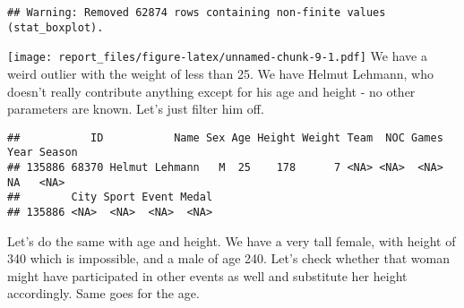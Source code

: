 \documentclass[
]{article}
\newenvironment{Shaded}{\begin{snugshade}}{\end{snugshade}}
\newcommand{\DecValTok}[1]{\textcolor[rgb]{0.00,0.00,0.81}{#1}}
\newcommand{\FunctionTok}[1]{\textcolor[rgb]{0.00,0.00,0.00}{#1}}
\newcommand{\NormalTok}[1]{#1}
\newcommand{\OtherTok}[1]{\textcolor[rgb]{0.56,0.35,0.01}{#1}}
\newcommand{\SpecialCharTok}[1]{\textcolor[rgb]{0.00,0.00,0.00}{#1}}
\begin{document}
\begin{verbatim}
## Warning: Removed 62874 rows containing non-finite values (stat_boxplot).
\end{verbatim}

\texttt{[image: report\_files/figure-latex/unnamed-chunk-9-1.pdf]} We
have a weird outlier with the weight of less than 25. We have Helmut
Lehmann, who doesn't really contribute anything except for his age and
height - no other parameters are known. Let's just filter him off.

\begin{Shaded}
\end{Shaded}

\begin{verbatim}
##           ID           Name Sex Age Height Weight Team  NOC Games Year Season
## 135886 68370 Helmut Lehmann   M  25    178      7 <NA> <NA>  <NA>   NA   <NA>
##        City Sport Event Medal
## 135886 <NA>  <NA>  <NA>  <NA>
\end{verbatim}

\begin{Shaded}
\end{Shaded}

Let's do the same with age and height. We have a very tall female, with
height of 340 which is impossible, and a male of age 240. Let's check
whether that woman might have participated in other events as well and
substitute her height accordingly. Same goes for the age.
\end{document}
